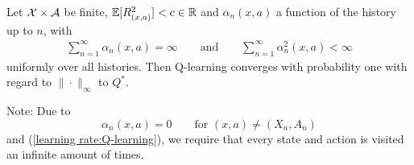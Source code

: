 \begin{corollary}[Q-learning]
    Let \(\mathcal{X}\times\mathcal{A}\) be finite, \(\mathbb{E}[R_{(x,a)}^2]<c\in\mathbb{R}\) and \(\alpha_n(x,a)\) a function of the history up to \(n\), with
    \begin{align}\label{learning rate:Q-learning}
        \sum_{n=1}^\infty \alpha_n(x,a)=\infty \qquad \text{and}\qquad \sum_{n=1}^\infty \alpha_n^2(x,a)<\infty
    \end{align}
    uniformly over all histories.
    Then Q-learning converges with probability one with regard to \(\|\cdot\|_\infty\) to \(Q^*\). 
\end{corollary}
Note: Due to 
    \[
        \alpha_n(x,a)=0 \qquad \text{for } (x,a)\neq (X_n,A_n) 
    \]
    and (\ref{learning rate:Q-learning}), we require that every state and action is visited an infinite amount of times.
